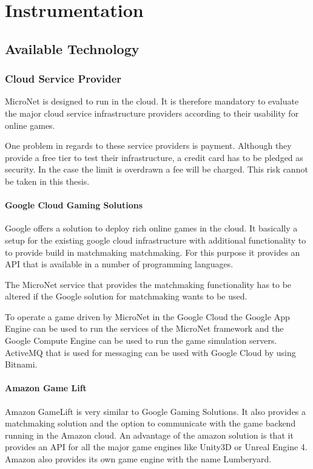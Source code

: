 \section{Instrumentation}

\subsection{Available Technology}

\subsubsection{Cloud Service Provider}

MicroNet is designed to run in the cloud. It is therefore mandatory to evaluate
the major cloud service infrastructure providers according to their usability
for online games.

One problem in regards to these service providers is payment. Although they
provide a free tier to test their infrastructure, a credit card has to be
pledged as security. In the case the limit is overdrawn a fee will be charged.
This risk cannot be taken in this thesis. 

\paragraph{Google Cloud Gaming Solutions}

Google offers a solution to deploy rich online games in the cloud. It basically
a setup for the existing google cloud infrastructure with additional
functionality to to provide build in matchmaking matchmaking. For this purpose
it provides an API that is available in a number of programming languages.

The MicroNet service that provides the matchmaking functionality has to be
altered if the Google solution for matchmaking wants to be used. 

To operate a game driven by MicroNet in the Google Cloud the Google App Engine
can be used to run the services of the MicroNet framework and the Google Compute
Engine can be used to run the game simulation servers. ActiveMQ that is used for
messaging can be used with Google Cloud by using Bitnami.

\paragraph{Amazon Game Lift}

Amazon GameLift is very similar to Google Gaming Solutions. It also provides a
matchmaking solution and the option to communicate with the game backend running
in the Amazon cloud. An advantage of the amazon solution is that it provides an
API for all the major game engines like Unity3D or Unreal Engine 4. Amazon also
provides its own game engine with the name Lumberyard.

